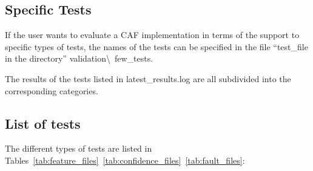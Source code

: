 \subsection{Specific Tests}
If the user wants to evaluate a CAF implementation in terms of
the support to specific types of tests, the names of the tests
can be specified in the file ``test\_file in the directory''
validation\textbackslash~few\_tests.

The results of the tests listed in latest\_results.log are all
subdivided into the corresponding categories.


\subsection{List of tests}

The different types of tests are listed in 
Tables~\ref{tab:feature_files}~\ref{tab:confidence_files}~\ref{tab:fault_files}:

